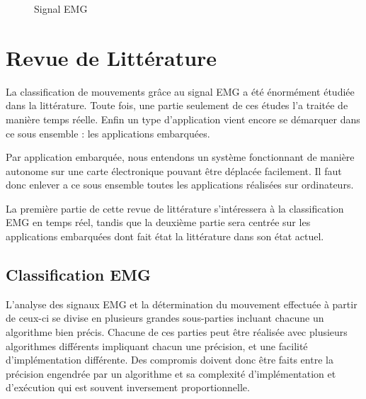 \documentclass[letterpaper, twoside, 12pt, memoire, creativecommons, hyperref]{thETS}
\begin{document}
\begin{figure}
	\centering
	\caption{Signal EMG}
	\label{fig:emg}
\end{figure}


\chapter{Revue de Littérature}

La classification de mouvements grâce au signal EMG a été énormément étudiée dans la littérature. Toute fois, une partie seulement de ces études l'a traitée de manière temps réelle. Enfin un type d'application vient encore se démarquer dans ce sous ensemble : les applications embarquées. 

Par application embarquée, nous entendons un système fonctionnant de manière autonome sur une carte électronique pouvant être déplacée facilement. Il faut donc enlever a ce sous ensemble toutes les applications réalisées sur ordinateurs. 

La première partie de cette revue de littérature s’intéressera à la classification EMG en temps réel, tandis que la deuxième partie sera centrée sur les applications embarquées dont fait état la littérature dans son état actuel.

\section{Classification EMG}

L’analyse des signaux EMG et la détermination du mouvement effectuée à partir de ceux-ci se divise en plusieurs grandes sous-parties incluant chacune un algorithme bien précis. Chacune de ces parties peut être réalisée avec plusieurs algorithmes différents impliquant chacun une précision, et une facilité d’implémentation différente. Des compromis doivent donc être faits entre la précision engendrée par un algorithme et sa complexité d’implémentation et d’exécution qui est souvent inversement proportionnelle. 
\end{document}

